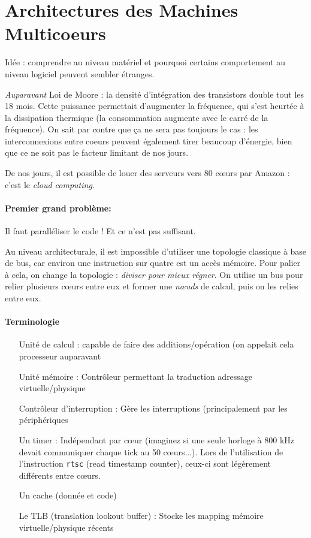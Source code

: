 \documentclass{article}
\begin{document}
\section{Architectures des Machines Multicoeurs}
Idée : comprendre au niveau matériel et pourquoi certains comportement au niveau logiciel peuvent sembler étranges.

\emph{Auparavant} Loi de Moore : la densité d'intégration des transistors double tout les 18 mois. Cette puissance permettait d'augmenter la fréquence, qui s'est heurtée à la dissipation thermique (la consommation augmente avec le carré de la fréquence). On sait par contre que ça ne sera pas toujours le cas : les interconnexions entre coeurs peuvent également tirer beaucoup d'énergie, bien que ce ne soit pas le facteur limitant de nos jours.

De nos jours, il est possible de louer des serveurs vers 80 cœurs par Amazon : c'est le \emph{cloud computing}.
\bigskip

\paragraph{Premier grand problème:}
Il faut paralléliser le code ! Et ce n'est pas suffisant.
\bigskip

Au niveau architecturale, il est impossible d'utiliser une topologie classique à base de bus, car environ une instruction sur quatre est un accès mémoire. Pour palier à cela, on change la topologie : \emph{diviser pour mieux régner}. On utilise un bus pour relier plusieurs cœurs entre eux et former une \emph{nœuds} de calcul, puis on les relies entre eux.
\bigskip

\paragraph{Terminologie}
\begin{itemize}
\item[Unité de calcul :] capable de faire des additions/opération (on appelait cela processeur auparavant
\item[Unité mémoire :] Contrôleur permettant la traduction adressage virtuelle/physique
\item[Contrôleur d'interruption :] Gère les interruptions (principalement par les périphériques
\item[Un timer :] Indépendant par cœur (imaginez si une seule horloge à 800 kHz devait communiquer chaque tick au 50 cœurs...). Lors de l'utilisation de l'instruction \texttt{rtsc} (read timestamp counter), ceux-ci sont légèrement différents entre cœurs.
\item[Un cache (donnée et code)]
\item[Le TLB (translation lookout buffer) :] Stocke les mapping mémoire virtuelle/physique récents
\end{itemize}
\end{document}
